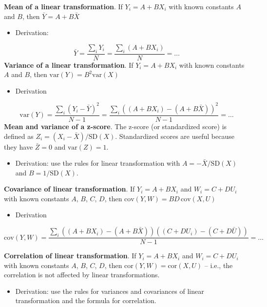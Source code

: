 \documentclass[
  letterpaper,
  DIV=11,
  numbers=noendperiod]{scrreprt}
\providecommand{\tightlist}{%
  \setlength{\itemsep}{0pt}\setlength{\parskip}{0pt}}\usepackage{longtable,booktabs,array}
\begin{document}
\textbf{Mean of a linear transformation}. If \(Y_i = A + B X_i\) with
known constants \(A\) and \(B\), then \(\bar{Y} = A + B \bar{X}\)

\begin{itemize}
\tightlist
\item
  Derivation:
\end{itemize}

\[ \bar{Y} =  \frac{\sum_i Y_i}{N} =  \frac{\sum_i( A + B X_i)}{N} = \dots \]
\textbf{Variance of a linear transformation}. If \(Y_i = A + B X_i\)
with known constants \(A\) and \(B\), then
\(\text{var}(Y) = B^2\text{var}(X)\)

\begin{itemize}
\tightlist
\item
  Derivation
\end{itemize}

\[ \text{var}(Y) =  \frac{\sum_i (Y_i - \bar{Y})^2}{N-1} =  \frac{\sum_i ((A + B X_i) - (A + B \bar{X}))^2}{N-1} = \dots\]
\textbf{Mean and variance of a z-score}. The z-score (or standardized
score) is defined as \(Z_i = (X_i - \bar{X}) / \text{SD}(X)\).
Standardized scores are useful because they have \(\bar{Z} = 0\) and
\(\text{var}(Z) = 1\).

\begin{itemize}
\tightlist
\item
  Derivation: use the rules for linear transformation with
  \(A = -\bar{X} / \text{SD}(X)\) and \(B = 1/ \text{SD}(X)\).
\end{itemize}

\textbf{Covariance of linear transformation}. If \(Y_i = A + B X_i\) and
\(W_i = C + D U_i\) with known constants \(A\), \(B\), \(C\), \(D\),
then \(\text{cov}(Y, W) = BD\,\text{cov}(X, U)\)

\begin{itemize}
\tightlist
\item
  Derivation
\end{itemize}

\[ \text{cov}(Y, W) =  \frac{\sum_i ((A + B X_i) - (A + B \bar{X}))((C + D U_i) - (C + D \bar{U}))}{N-1} = \dots\]

\textbf{Correlation of linear transformation}. If \(Y_i = A + B X_i\)
and \(W_i = C + D U_i\) with known constants \(A\), \(B\), \(C\), \(D\),
then \(\text{cor}(Y, W) = \text{cor}(X, U)\) -- i.e., the correlation is
not affected by linear transformations.

\begin{itemize}
\tightlist
\item
  Derivation: use the rules for variances and covariances of linear
  transformation and the formula for correlation.
\end{itemize}
\end{document}
